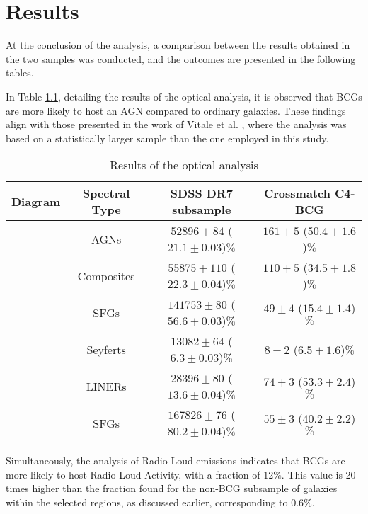 \chapter{Results}
At the conclusion of the analysis, a comparison between the results obtained in the two samples was conducted, and the outcomes are presented in the following tables.

In Table \ref{tab:Optical}, detailing the results of the optical analysis, it is observed that BCGs are more likely to host an AGN compared to ordinary galaxies. These findings align with those presented in the work of Vitale et al. \cite{2012A&A...546A..17V}, where the analysis was based on a statistically larger sample than the one employed in this study.

\vspace{1cm}
\begin{table}[htb]
  \centering
  \begin{tabular}{||c|ccc||}
    \hline\hline
    \multicolumn{1}{||c}{Diagram} & Spectral Type & SDSS DR7 subsample & Crossmatch C4-BCG \\
    \hline
    [NII]  & AGNs &  $52896 \pm 84$ ($21.1 \pm 0.03$)$\%$ &$161 \pm 5$ ($50.4 \pm 1.6$)$\%$ \\
           & Composites & $55875 \pm 110$ ($22.3 \pm 0.04$)$\%$ & $110 \pm 5$ ($34.5 \pm 1.8$)$\%$ \\
           & SFGs & $141753 \pm 80$ ($56.6 \pm 0.03$)$\%$ &$ 49 \pm 4$ ($15.4 \pm 1.4$)$\%$ \\ 
    \hline
    [SII]  & Seyferts & $13082 \pm 64$ ($6.3 \pm 0.03$)$\%$  &$8 \pm 2$ ($6.5 \pm 1.6$)$\%$\\
           & LINERs & $28396 \pm 80$ ($13.6 \pm 0.04$)$\%$ & $74 \pm 3$ ($53.3 \pm 2.4$)$\%$ \\
           & SFGs &$167826\pm 76 $ ($80.2 \pm 0.04$)$\%$ & $55 \pm 3$ ($40.2 \pm 2.2$)$\%$\\ 
    \hline\hline
  \end{tabular}
  \caption{Results of the optical analysis}
  \label{tab:Optical}
\end{table}



Simultaneously, the analysis of Radio Loud emissions indicates that BCGs are more likely to host Radio Loud Activity, with a fraction of $12\%$. This value is 20 times higher than the fraction found for the non-BCG subsample of galaxies within the selected regions, as discussed earlier, corresponding to $0.6\%$.
